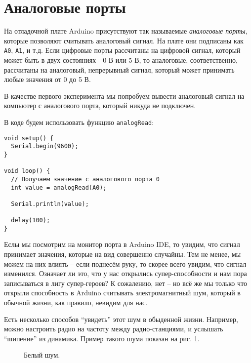 \documentclass[../sparc.tex]{subfiles}
\begin{document}
\section{Аналоговые порты}
\label{section:analog-ports}

На отладочной плате Arduino присутствуют так называемые \emph{аналоговые порты},
которые позволяют считывать аналоговый сигнал.  На плате они подписаны как
\texttt{A0}, \texttt{A1}, и т.д. Если цифровые порты рассчитаны на цифровой
сигнал, который может быть в двух состояниях - 0 В или 5 В, то аналоговые,
соответственно, рассчитаны на аналоговый, непрерывный сигнал, который может
принимать любые значения от 0 до 5 В.

В качестве первого эксперимента мы попробуем вывести аналоговый сигнал на
компьютер с аналогового порта, который никуда не подключен.

В коде будем использовать функцию \texttt{analogRead}:

\begin{verbatim}
void setup() {
  Serial.begin(9600);
}

void loop() {
  // Получаем значение с аналогового порта 0
  int value = analogRead(A0);

  Serial.println(value);

  delay(100);
}
\end{verbatim}

Еслы мы посмотрим на монитор порта в Arduino IDE, то увидим, что сигнал
принимает значения, которые на вид совершенно случайны.  Тем не менее, мы можем
на них влиять -- если поднесём руку, то скорее всего увидим, что сигнал
изменился.  Означает ли это, что у нас открылись супер-способности и нам пора
записываться в лигу супер-героев?  К сожалению, нет -- но всё же мы только что
открыли способность в Arduino считывать электромагнитный шум, который в обычной
жизни, как правило, невидим для нас.

Есть несколько способов ``увидеть'' этот шум в обыденной жизни.  Например, можно
настроить радио на частоту между радио-станциями, и услышать ``шипение'' из
динамика.  Пример такого шума показан на рис. \ref{fig:white-noize}.

\begin{figure}[ht]
  \centering
  \caption{Белый шум.}
  \label{fig:white-noize}
\end{figure}
\end{document}
